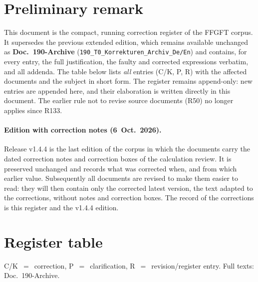
\providecommand{\QM}{\textbf{[Q]}}
\section*{Preliminary remark}

This document is the compact, running correction register of the FFGFT corpus. It supersedes the previous extended edition, which remains available unchanged as \textbf{Doc.~190-Archive} (\texttt{190\_T0\_Korrekturen\_Archiv\_De/En}) and contains, for every entry, the full justification, the faulty and corrected expressions verbatim, and all addenda. The table below lists \emph{all} entries (C/K, P, R) with the affected documents and the subject in short form. The register remains append-only: new entries are appended here, and their elaboration is written directly in this document. The earlier rule not to revise source documents (R50) no longer applies since R133.

\paragraph{Edition with correction notes (6~Oct.~2026).} Release v1.4.4 is the last edition of the corpus in which the documents carry the dated correction notes and correction boxes of the calculation review. It is preserved unchanged and records what was corrected when, and from which earlier value. Subsequently all documents are revised to make them easier to read: they will then contain only the corrected latest version, the text adapted to the corrections, without notes and correction boxes. The record of the corrections is this register and the v1.4.4 edition.

\section{Register table}

\noindent C/K~$=$~correction, P~$=$~clarification, R~$=$~revision/register entry. Full texts: Doc.~190-Archive.

